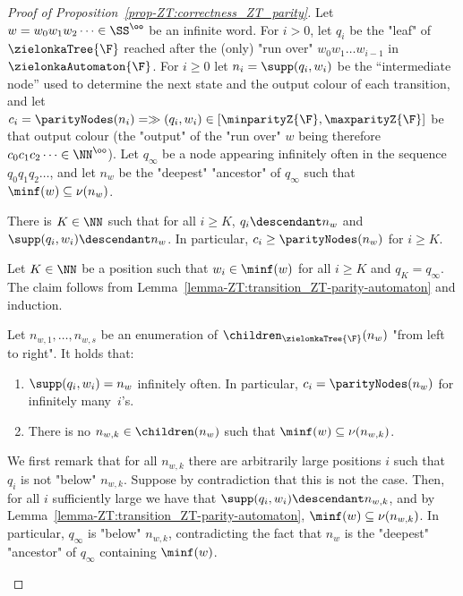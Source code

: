 \documentclass{theoretics}
\begin{document}
\begin{proof}[Proof of Proposition~\ref{prop-ZT:correctness_ZT_parity}]
	Let $w = w_0w_1w_2\dots \in \SS^\oo$ be an infinite word. For $i>0$, let 
	 $q_i$ be the "leaf" of $\zielonkaTree{\F}$ reached after the (only) "run over" $w_0w_1\dots w_{i-1}$ in $\zielonkaAutomaton{\F}$. 
	For $i\geq 0$ let $n_i = \supp(q_i,w_i)$ be the ``intermediate node'' used to determine the next state and the output colour of each transition, and let $c_i = \parityNodes(n_i) = \gg(q_i, w_i) \in [\minparityZ{\F}, \maxparityZ{\F}]$ be that output colour (the "output" of the "run over" $w$ being therefore $c_0c_1c_2\dots \in \NN^\oo$). 
	Let $q_\infty$ be a node appearing infinitely often in the sequence $q_0q_1q_2\dots$, and let $n_w$ be the "deepest" "ancestor" of $q_\infty$ such that $\minf(w)\subseteq \nu(n_w)$.
	\begin{claim}\label{claim:supp-below-n-CORRECT-ZT}
		 There is $K\in \NN$ such that for all $i \geq K$, $q_i \descendant n_w$ and $\supp(q_i, w_i) \descendant n_w$. In particular, $c_i \geq \parityNodes(n_w)$ for $i\geq K$.
	\end{claim}
	\begin{subproof}
		Let $K\in \NN$ be a position such that $w_i \in \minf(w)$ for all $i\geq K$ and $q_K = q_\infty$.
		The claim follows from Lemma~\ref{lemma-ZT:transition_ZT-parity-automaton} and induction.
	\end{subproof}
	\begin{claim}\label{claim:supp-n_inf_often-CORRECT-ZT}
		Let $n_{w,1},\dots, n_{w,s}$ be an enumeration of $\children_{\zielonkaTree{\F}}(n_w)$ "from left to right". It holds that:
		\begin{enumerate}
			\item $\supp(q_i,w_i) = n_w$ infinitely often. In particular, $c_i = \parityNodes(n_w)$ for infinitely many~$i$'s.
			\item There is no $n_{w,k}\in \children(n_w)$ such that $\minf(w) \subseteq \nu(n_{w,k})$.
		\end{enumerate}	
	\end{claim}
	\begin{subproof}
		We first remark that for all $n_{w,k}$ there are arbitrarily large positions $i$ such that $q_i$ is not "below" $n_{w,k}$. Suppose by contradiction that this is not the case. Then, for all $i$ sufficiently large we have that $\supp(q_i, w_i) \descendant n_{w,k}$, and by Lemma~\ref{lemma-ZT:transition_ZT-parity-automaton}, $\minf(w)\subseteq \nu(n_{w,k})$. In particular, $q_\infty$ is "below" $n_{w,k}$, contradicting the fact that $n_w$ is the "deepest" "ancestor" of $q_\infty$ containing $\minf(w)$.
		

\end{subproof}
\end{proof}
\end{document}
